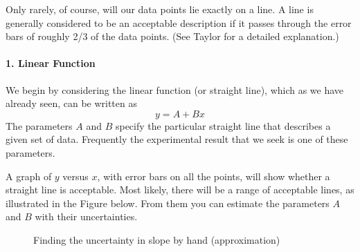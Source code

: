 Only rarely, of course, will our data points lie exactly on a line.  A line is
generally considered to be an acceptable description
if it passes through the error bars of roughly 2/3 of the data points.  (See
Taylor for a detailed explanation.)


\paragraph*{1. Linear Function}
     We begin by considering the  linear function (or straight line), which
as we have already seen, can be written as
\begin{equation}
y = A + Bx  \label{eq:c1}
\end{equation}
The parameters $A$ and $B$ specify the particular straight line
that describes a given set of data.  Frequently
the experimental result that we seek is one of these parameters.

A graph of $y$ versus $x$, with error bars
on all the points, will show whether a straight line is acceptable.  Most
likely, there will be a range of acceptable lines, as illustrated
in the Figure below.
From them you can estimate the parameters $A$ and $B$ with their uncertainties.

\begin{figure}[hbt]    %
\begin{center}
{}
\end{center}
\caption{Finding the uncertainty in slope by hand (approximation)  \label{fig:slope}}
\end{figure}

